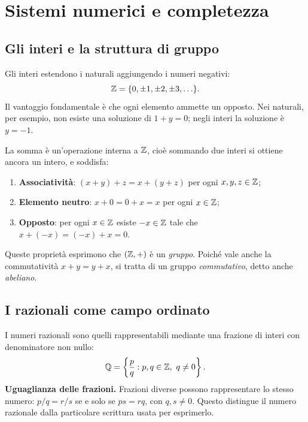 \chapter{Sistemi numerici e completezza}
\label{cap:sistemi-numerici}

\section{Gli interi e la struttura di gruppo}

Gli interi estendono i naturali aggiungendo i numeri negativi:
\[
  \mathbb{Z}=\{0,\pm1,\pm2,\pm3,\ldots\}.
\]
Il vantaggio fondamentale è che ogni elemento ammette un opposto. Nei naturali, per esempio, non esiste una soluzione di $1+y=0$; negli interi la soluzione è $y=-1$.

La somma è un'operazione interna a $\mathbb{Z}$, cioè sommando due interi si ottiene ancora un intero, e soddisfa:
\begin{enumerate}[label=(\alph*)]
  \item \textbf{Associatività}: $(x+y)+z=x+(y+z)$ per ogni $x,y,z\in\mathbb{Z}$;
  \item \textbf{Elemento neutro}: $x+0=0+x=x$ per ogni $x\in\mathbb{Z}$;
  \item \textbf{Opposto}: per ogni $x\in\mathbb{Z}$ esiste $-x\in\mathbb{Z}$ tale che $x+(-x)=(-x)+x=0$.
\end{enumerate}
Queste proprietà esprimono che $(\mathbb{Z},+)$ è un \emph{gruppo}. Poiché vale anche la commutatività $x+y=y+x$, si tratta di un gruppo \emph{commutativo}, detto anche \emph{abeliano}.

\section{I razionali come campo ordinato}

I numeri razionali sono quelli rappresentabili mediante una frazione di interi con denominatore non nullo:
\[
  \Q=\left\{\frac pq:p,q\in\Z,\ q\ne0\right\}.
\]
\textbf{Uguaglianza delle frazioni.} Frazioni diverse possono rappresentare lo stesso numero: $p/q=r/s$ se e solo se $ps=rq$, con $q,s\ne0$. Questo distingue il numero razionale dalla particolare scrittura usata per esprimerlo.

